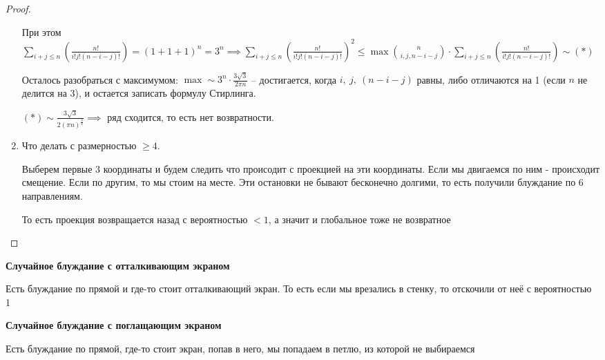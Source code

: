 \begin{proof}
\begin{enumerate}
{            При этом $\sum\limits_{i + j \leqslant n} \left( \frac{n!}{i!j!(n - i - j)!} \right) = (1 + 1 + 1)^n = 3^n \implies \sum\limits_{i + j \leqslant n} \left( \frac{n!}{i!j!(n - i - j)!} \right)^2 \leqslant \max \binom{n}{i, j, n - i - j} \cdot \sum\limits_{i + j \leqslant n} \left( \frac{n!}{i!j!(n - i - j)!} \right) \sim (*)$

            Осталось разобраться с максимумом: $\max \sim 3^n \cdot \frac{3\sqrt{3}}{2 \pi n}$ -- достигается, когда $i, \ j, \ (n - i - j)$ равны, либо отличаются на 1 (если $n$ не делится на 3), и остается записать формулу Стирлинга.

            $(*) \sim \frac{3\sqrt{3}}{2 (\pi n)^{\frac{3}{2}}} \implies $ ряд сходится, то есть нет возвратности.
        }
        \item {
            Что делать с размерностью $\geqslant 4$.
            
            Выберем первые 3 координаты и будем следить что происодит с проекцией на эти координаты. 
            Если мы двигаемся по ним - происходит смещение. Если по другим, то мы стоим на месте. Эти остановки не бывают бесконечно долгими, то есть получили блуждание по 6 направлениям.

            То есть проекция возвращается назад с вероятностью $< 1$, а значит и глобальное тоже не возвратное
        }
    \end{enumerate}
\end{proof}

\begin{remark}
    \textbf{Случайное блуждание с отталкивающим экраном}

    Есть блуждание по прямой и где-то стоит отталкивающий экран. То есть если мы врезались в стенку, то отскочили от неё с вероятностью 1
\end{remark}

\begin{remark}
    \textbf{Случайное блуждание с поглащающим экраном}
    
    Есть блуждание по прямой, где-то стоит экран, попав в него, мы попадаем в петлю, из которой не выбираемся
\end{remark}

